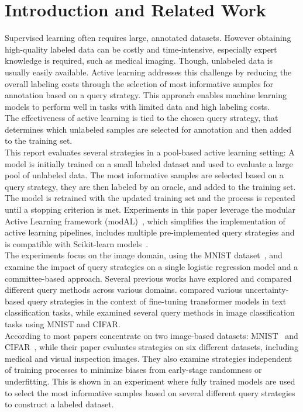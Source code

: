 \documentclass{article}
\theoremstyle{plain}
\theoremstyle{definition}
\theoremstyle{remark}
\begin{document}
\section{Introduction and Related Work}\label{sec:intro}
Supervised learning often requires large, annotated datasets. However obtaining high-quality labeled data can be costly and time-intensive, especially expert knowledge is required, such as medical imaging. Though, unlabeled data is usually easily available. 
Active learning addresses this challenge by reducing the overall labeling costs through the selection of most informative samples for annotation based on a query strategy. This approach enables machine learning models to perform well in tasks with limited data and high labeling costs. \\
The effectiveness of active learning is tied to the chosen query strategy, that determines which unlabeled samples are selected for annotation and then added to the training set. \\
This report evaluates several strategies in a pool-based active learning setting: A model is initially trained on a small labeled dataset and used to evaluate a large pool of unlabeled data. The most informative samples are selected based on a query strategy, they are then labeled by an oracle, and added to the training set. The model is retrained with the updated training set and the process is repeated until a stopping criterion is met.
Experiments in this paper leverage the modular Active Learning framework (modAL)~\cite{danka_modalmodularactivelearning}, which simplifies the implementation of active learning pipelines, includes multiple pre-implemented query strategies and is compatible with Scikit-learn models~\cite{scikit-learn}. \\
The experiments focus on the image domain, using the MNIST dataset~\cite{mnist}, and examine the impact of query strategies on a single logistic regression model and a committee-based approach.
Several previous works have explored and compared different query methods across various domains. \cite{schröder_revisitinguncertaintybasedquerystrategies} compared various uncertainty-based query strategies in the context of fine-tuning transformer models in text classification tasks, while \cite{zhan_comparativesurveydeepactive} examined several query methods in image classification tasks using MNIST and CIFAR. \\
According to \cite{ueno_benchmarkingofquerystrategies} most papers concentrate on two image-based datasets: MNIST~\cite{mnist} and CIFAR~\cite{cifar}, while their paper evaluates strategies on six different datasets, including medical and visual inspection images. They also examine strategies independent of training processes to minimize biases from early-stage randomness or underfitting. This is shown in an experiment where fully trained models are used to select the most informative samples based on several different query strategies to construct a labeled dataset. \\ 
\end{document}

